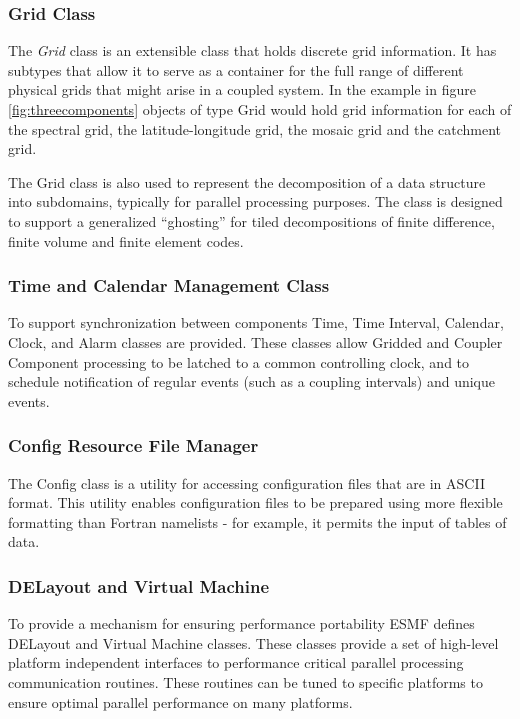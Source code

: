 \subsubsection{Grid Class}
The {\it Grid} class is an extensible class that holds discrete grid information. It has subtypes that allow
it to serve as a container for the full range of different physical grids that might arise in a coupled system.
In the example in figure \ref{fig:threecomponents} objects of type Grid would hold grid information for
each of the spectral grid, the latitude-longitude grid, the mosaic grid and the catchment grid. 

The Grid class is also used to represent the decomposition of a data structure into subdomains, typically for
parallel processing purposes. The class is designed to support a 
generalized ``ghosting'' for tiled 
decompositions of finite difference, finite volume and finite element codes. 

\subsubsection{Time and Calendar Management Class}
To support synchronization between components Time, Time Interval,  Calendar,
Clock, and Alarm classes are provided. These classes allow Gridded and 
Coupler Component processing
to be latched to a common controlling clock, and to schedule notification of
regular events (such as a coupling intervals) and unique events.

\subsubsection{Config Resource File Manager}
The Config class is a utility for accessing configuration files that are in
ASCII format.  This utility enables configuration files to be prepared using
more flexible formatting than Fortran namelists - for example, it permits the
input of tables of data.

\subsubsection{DELayout and Virtual Machine}
To provide a mechanism for ensuring performance portability ESMF defines DELayout and Virtual Machine classes. These classes provide a set of
high-level platform independent interfaces to performance critical parallel processing communication routines. These routines can be tuned
to specific platforms to ensure optimal parallel performance on many platforms. 
